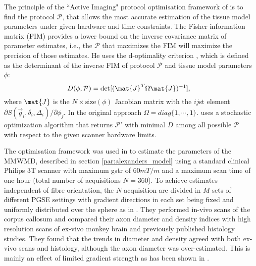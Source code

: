 The principle of the ``Active Imaging" protocol optimisation framework of \cite{Alexander:2008} is to find the protocol $\mathcal{P}$, that allows the most accurate estimation of the tissue model parameters under given hardware and time constraints. The Fisher information matrix (FIM) provides a lower bound on the inverse covariance matrix of parameter estimates, i.e., the $\mathcal{P}$ that maximizes the FIM will maximize the precision of those estimates. He uses the d-optimality criterion \citep{OBrien:2003}, which is defined as the determinant of the inverse FIM of protocol $\mathcal{P}$ and tissue model parameters $\phi$:
\begin{equation}
	D(\phi,\mathcal{P})=\det[(\mat{J}^T\Omega\mat{J})^{-1}], 
	\label{eq-optimality}
\end{equation}
where $\mat{J}$ is the $N\times \mbox{size}(\phi)$ Jacobian matrix with the $ij$st element $\partial S(\vec{g}_i,\delta_i,\Delta_i) / \partial \phi_j$. In the original approach $\Omega=diag\{1,\cdots,1\}$. \citet{Alexander:2008} uses a stochastic optimization algorithm \citep{Zelinka:2010} that returns $\mathcal{P}'$ with minimal $D$ among all possible $\mathcal{P}$ with respect to the given scanner hardware limits.

The optimisation framework was used in \citet{Alexander:2010} to estimate the parameters of the \gls{MMWMD}, described in section \ref{par:alexanders_model} using a standard clinical Philips 3T scanner with maximum {\gls{gstr}} of $60mT/m$ and a maximum scan time of one hour (total number of acquisitions $N=360$). To achieve estimates independent of fibre orientation, the $N$ acquisition are divided in $M$ sets of different PGSE settings with gradient directions in each set being fixed and uniformly distributed over the sphere as in \cite{Jones:2004a}. They performed in-vivo scans of the corpus callosum and compared their axon diameter and density indices with high resolution scans of ex-vivo monkey brain and previously published histology studies. They found that the trends in diameter and density agreed with both ex-vivo scans and histology, although the axon diameter was over-estimated. This is mainly an effect of limited gradient strength as has been shown in \cite{Dyrby:2010}.  

    


